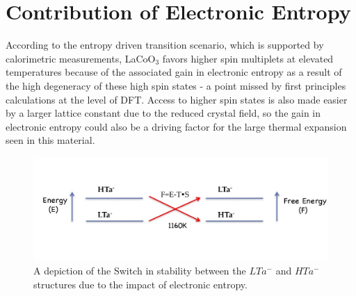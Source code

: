 \documentclass[10pt]{ruthesis}
\begin{document}
{ 







\section{Contribution of Electronic Entropy} 
According to the entropy driven transition scenario, which is supported by calorimetric measurements\cite{Stolen}, LaCoO$_3$ favors higher spin multiplets  at elevated temperatures because of the  associated gain in electronic entropy as a result of the high degeneracy of these high spin states - a point missed by first principles calculations at the level of DFT. Access to higher spin states is also made easier by a larger lattice constant due to the reduced crystal field, so the gain in electronic entropy could also be a driving factor for the large thermal expansion seen in this material.
\begin{figure}[H]
 \begin{center}
 \includegraphics[width=\columnwidth]{Entropy_swap.jpg}
 \caption{A depiction of the Switch in stability between the $LTa^-$ and $HTa^-$  structures due to the impact of electronic entropy.}\label{Entropy_Swap}
 \end{center}
 \end{figure}

}
\end{document}
